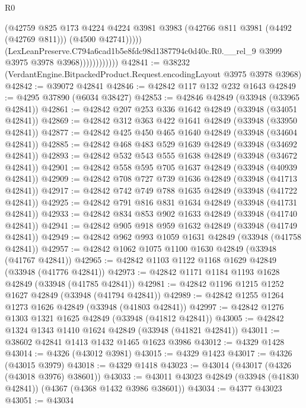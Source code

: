 \begin{lexlean}{R0}
\begin{coremodule}
                                (@42759
                                  @825
                                  @173
                                  @4224
                                  @4224
                                  @3981
                                  @3983
                                  (@42766 @811 @3981 (@4492 (@42769 @811)))
                                  (@4500 @42741)))))
                          (LexLeanPreserve.C794a6cad1b5e8fdc98d1387794c0d40c.R0.__rel_9
                            @3999
                            @3975
                            @3978
                            @3968))))))))))))
@42841 := @38232 (VerdantEngine.BitpackedProduct.Request.encodingLayout @3975 @3978 @3968)
@42842 := @39072 @42841
@42846 := @42842 @117 @132 @232 @1643
@42849 := @4295 @37890 (@6034 @38427)
@42853 := @42846 @42849 (@33948 (@33965 @42841))
@42861 := @42842 @207 @253 @336 @1642 @42849 (@33948 (@34051 @42841))
@42869 := @42842 @312 @363 @422 @1641 @42849 (@33948 (@33950 @42841))
@42877 := @42842 @425 @450 @465 @1640 @42849 (@33948 (@34604 @42841))
@42885 := @42842 @468 @483 @529 @1639 @42849 (@33948 (@34692 @42841))
@42893 := @42842 @532 @543 @555 @1638 @42849 (@33948 (@34672 @42841))
@42901 := @42842 @558 @595 @705 @1637 @42849 (@33948 (@40939 @42841))
@42909 := @42842 @708 @727 @739 @1636 @42849 (@33948 (@41713 @42841))
@42917 := @42842 @742 @749 @788 @1635 @42849 (@33948 (@41722 @42841))
@42925 := @42842 @791 @816 @831 @1634 @42849 (@33948 (@41731 @42841))
@42933 := @42842 @834 @853 @902 @1633 @42849 (@33948 (@41740 @42841))
@42941 := @42842 @905 @918 @959 @1632 @42849 (@33948 (@41749 @42841))
@42949 := @42842 @962 @993 @1059 @1631 @42849 (@33948 (@41758 @42841))
@42957 := @42842 @1062 @1075 @1100 @1630 @42849 (@33948 (@41767 @42841))
@42965 := @42842 @1103 @1122 @1168 @1629 @42849 (@33948 (@41776 @42841))
@42973 := @42842 @1171 @1184 @1193 @1628 @42849 (@33948 (@41785 @42841))
@42981 := @42842 @1196 @1215 @1252 @1627 @42849 (@33948 (@41794 @42841))
@42989 := @42842 @1255 @1264 @1273 @1626 @42849 (@33948 (@41803 @42841))
@42997 := @42842 @1276 @1303 @1321 @1625 @42849 (@33948 (@41812 @42841))
@43005 := @42842 @1324 @1343 @1410 @1624 @42849 (@33948 (@41821 @42841))
@43011 := @38602 @42841 @1413 @1432 @1465 @1623 @3986
@43012 := @4329 @1428
@43014 := @4326 (@43012 @3981)
@43015 := @4329 @1423
@43017 := @4326 (@43015 @3979)
@43018 := @4329 @1418
@43023 := @43014 (@43017 (@4326 (@43018 @3976) @38601))
@43033 := @43011 @43023 @42849 (@33948 (@41830 @42841)) (@4367 (@4368 @1432 @3986 @38601))
@43034 := @4377 @43023
@43051 := @43034

\end{coremodule}
\end{lexlean}
